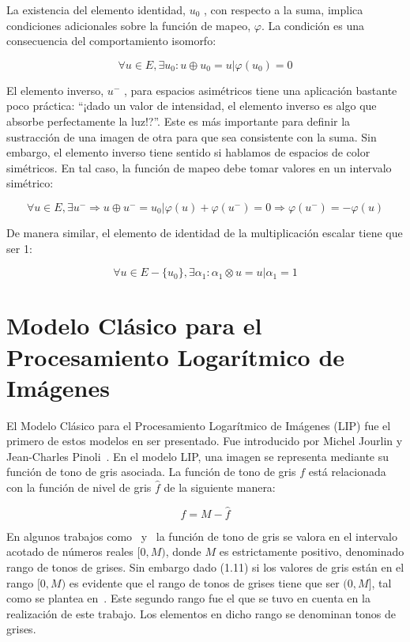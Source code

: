 La existencia del elemento identidad, $u_0$ , con respecto a la suma, implica condiciones adicionales sobre la función de mapeo, $\varphi$. La condición es una consecuencia del comportamiento isomorfo:

\begin{equation}
	\forall u\in E, \exists u_0 : u \oplus u_0 = u | \varphi(u_0)=0
\end{equation}

El elemento inverso, $u^-$ , para espacios asimétricos tiene una aplicación bastante poco práctica: ``\textquestiondown¡dado un valor de intensidad, el elemento inverso es algo que absorbe perfectamente la luz!?''. Este es más importante para definir la sustracción de una imagen de otra para que sea consistente con la suma. Sin embargo, el elemento inverso tiene sentido si hablamos de espacios de color simétricos. En tal caso, la función de mapeo debe tomar valores en un intervalo simétrico:

\begin{equation}
	\forall u \in E, \exists u^- \Rightarrow u \oplus u^- = u_0 | \varphi(u) + \varphi(u^-) = 0 \Rightarrow \varphi(u^-)=-\varphi(u) 
\end{equation}

De manera similar, el elemento de identidad de la multiplicación escalar tiene que ser 1:

\begin{equation}
	\forall u \in E - \{u_0\}, \exists \alpha_1 : \alpha_1 \otimes u = u | \alpha_1 = 1
\end{equation}

\section{Modelo Cl\'asico para el Procesamiento Logar\'itmico de Im\'agenes}

El Modelo Cl\'asico para el Procesamiento Logar\'itmico de Im\'agenes (LIP) fue el primero de estos modelos en ser presentado. Fue introducido por Michel Jourlin y Jean-Charles Pinoli~\cite{jourlin1988model}. En el modelo LIP, una imagen se representa mediante su función de tono de gris asociada. La función de tono de gris $f$ está relacionada con la función de nivel de gris $\hat{f}$ de la siguiente manera:

\begin{equation}
	f = M - \hat{f}
\end{equation}

En algunos trabajos como~\cite{jourlin1988model} y~\cite{navarro2013symmetric} la función de tono de gris se valora en el intervalo acotado de números reales $[0, M)$, donde $M$ es estrictamente positivo, denominado rango de tonos de grises. Sin embargo dado (1.11) si los valores de gris est\'an en el rango $[0,M)$ es evidente que el rango de tonos de grises tiene que ser $(0,M]$, tal como se plantea en~\cite{panetta2010parameterized}. Este segundo rango fue el que se tuvo en cuenta en la realizaci\'on de este trabajo. Los elementos en dicho rango se denominan tonos de grises.

